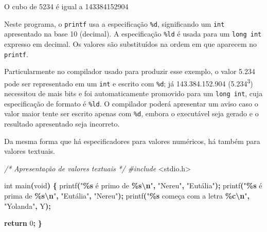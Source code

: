 \documentclass[
  11pt,
  a4paper,
]{scrbook}
\newenvironment{Shaded}{\begin{snugshade}}{\end{snugshade}}
\newcommand{\CharTok}[1]{\textcolor[rgb]{0.31,0.60,0.02}{#1}}
\newcommand{\CommentTok}[1]{\textcolor[rgb]{0.56,0.35,0.01}{\textit{#1}}}
\newcommand{\ControlFlowTok}[1]{\textcolor[rgb]{0.13,0.29,0.53}{\textbf{#1}}}
\newcommand{\DataTypeTok}[1]{\textcolor[rgb]{0.13,0.29,0.53}{#1}}
\newcommand{\DecValTok}[1]{\textcolor[rgb]{0.00,0.00,0.81}{#1}}
\newcommand{\ImportTok}[1]{#1}
\newcommand{\NormalTok}[1]{#1}
\newcommand{\OperatorTok}[1]{\textcolor[rgb]{0.81,0.36,0.00}{\textbf{#1}}}
\newcommand{\PreprocessorTok}[1]{\textcolor[rgb]{0.56,0.35,0.01}{\textit{#1}}}
\newcommand{\SpecialCharTok}[1]{\textcolor[rgb]{0.81,0.36,0.00}{\textbf{#1}}}
\newcommand{\StringTok}[1]{\textcolor[rgb]{0.31,0.60,0.02}{#1}}
\begin{document}
\begin{Shaded}
\begin{Highlighting}[]
\NormalTok{O cubo de 5234 é igual a 143384152904}
\end{Highlighting}
\end{Shaded}

Neste programa, o \texttt{printf} usa a especificação \texttt{\%d},
significando um \texttt{int} apresentado na base 10 (decimal). A
especificação \texttt{\%ld} é usada para um \texttt{long\ int} expresso
em decimal. Os valores são substituídos na ordem em que aparecem no
\texttt{printf}.

Particularmente no compilador usado para produzir esse exemplo, o valor
5.234 pode ser representado em um \texttt{int} e escrito com
\texttt{\%d}; já 143.384.152.904 (5.234\textsuperscript{3}) necessitou
de mais bits e foi automaticamente promovido para um \texttt{long\ int},
cuja especificação de formato é \texttt{\%ld}. O compilador poderá
apresentar um aviso caso o valor maior tente ser escrito apenas com
\texttt{\%d}, embora o executável seja gerado e o resultado apresentado
seja incorreto.

Da mesma forma que há especificadores para valores numéricos, há também
para valores textuais.

\begin{Shaded}
\begin{Highlighting}[]
\CommentTok{/*}
\CommentTok{Apresentação de valores textuais}
\CommentTok{*/}
\PreprocessorTok{\#include }\ImportTok{\textless{}stdio.h\textgreater{}}

\DataTypeTok{int}\NormalTok{ main}\OperatorTok{(}\DataTypeTok{void}\OperatorTok{)} \OperatorTok{\{}
\NormalTok{    printf}\OperatorTok{(}\StringTok{"}\SpecialCharTok{\%s}\StringTok{ é primo de }\SpecialCharTok{\%s\textbackslash{}n}\StringTok{"}\OperatorTok{,} \StringTok{"Nereu"}\OperatorTok{,} \StringTok{"Eutália"}\OperatorTok{);}
\NormalTok{    printf}\OperatorTok{(}\StringTok{"}\SpecialCharTok{\%s}\StringTok{ é prima de }\SpecialCharTok{\%s\textbackslash{}n}\StringTok{"}\OperatorTok{,} \StringTok{"Eutália"}\OperatorTok{,} \StringTok{"Nereu"}\OperatorTok{);}
\NormalTok{    printf}\OperatorTok{(}\StringTok{"}\SpecialCharTok{\%s}\StringTok{ começa com a letra }\SpecialCharTok{\%c\textbackslash{}n}\StringTok{"}\OperatorTok{,} \StringTok{"Yolanda"}\OperatorTok{,} \CharTok{\textquotesingle{}Y\textquotesingle{}}\OperatorTok{);}

    \ControlFlowTok{return} \DecValTok{0}\OperatorTok{;}
\OperatorTok{\}}
\end{Highlighting}
\end{Shaded}
\end{document}
